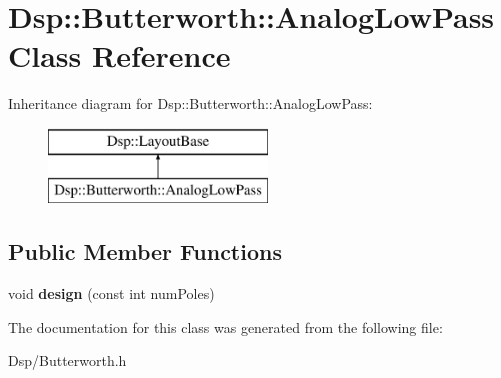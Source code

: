 \hypertarget{classDsp_1_1Butterworth_1_1AnalogLowPass}{\section{Dsp\-:\-:Butterworth\-:\-:Analog\-Low\-Pass Class Reference}
\label{classDsp_1_1Butterworth_1_1AnalogLowPass}
}
Inheritance diagram for Dsp\-:\-:Butterworth\-:\-:Analog\-Low\-Pass\-:\begin{figure}[H]
\begin{center}
\leavevmode
\includegraphics[height=2.000000cm]{classDsp_1_1Butterworth_1_1AnalogLowPass}
\end{center}
\end{figure}
\subsection*{Public Member Functions}
\begin{DoxyCompactItemize}
\item 
\hypertarget{classDsp_1_1Butterworth_1_1AnalogLowPass_aff4db1192d8c0bbf27555b67f58a5f6d}{void {\bfseries design} (const int num\-Poles)}\label{classDsp_1_1Butterworth_1_1AnalogLowPass_aff4db1192d8c0bbf27555b67f58a5f6d}

\end{DoxyCompactItemize}


The documentation for this class was generated from the following file\-:\begin{DoxyCompactItemize}
\item 
Dsp/Butterworth.\-h\end{DoxyCompactItemize}
